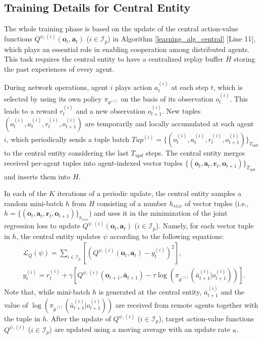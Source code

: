 \vspace{-10pt}
\subsection{Training Details for Central Entity}

The whole training phase is based on the update of the central action-value functions $Q^{\psi,(i)}(\mathbf{o}_t,\mathbf{a}_t)$ ($i\in\mathcal{I}_p$) in Algorithm \ref{learning_alg_central} [Line 11], which plays an essential role in enabling cooperation among distributed agents. 
This task requires the central entity to have a centralized replay buffer $H$ storing the past experiences of every agent.
	
During network operations, agent $i$ plays action $a^{(i)}_t$ at each step $t$, which is selected by using its own policy $\pi_{\theta^{(i)}}$ on the basis of its observation $o^{(i)}_t$. This leads to a reward $r^{(i)}_t$ and a new observation $o^{(i)}_{t+1}$. New tuples $(o^{(i)}_t, a^{(i)}_t, r^{(i)}_t, o^{(i)}_{t+1})$ are temporarily and locally accumulated at each agent $i$, which periodically sends a tuple batch $Tup^{(i)}=\{(o^{(i)}_t, a^{(i)}_t, r^{(i)}_t, o^{(i)}_{t+1})\}_{T_{upd}}$ to the central entity considering the last $T_{upd}$ steps. The central entity merges received per-agent tuples into agent-indexed vector tuples $\{(\mathbf{o}_t,\mathbf{a}_t,\mathbf{r}_t,\mathbf{o}_{t+1})\}_{T_{upd}}$ and inserts them into $H$.

In each of the $K$ iterations of a periodic update, the central entity samples a random mini-batch $h$ from $H$ consisting of a number $h_{size}$ of vector tuples (i.e., $h=\{(\mathbf{o}_t, \mathbf{a}_t, \mathbf{r}_t, \mathbf{o}_{t+1})\}_{h_{size}}$) and uses it in the minimization of the joint regression loss to update $Q^{\psi,(i)}(\mathbf{o}_t,\mathbf{a}_t)$ ($i\in\mathcal{I}_p$). Namely, for each vector tuple in $h$, the central entity updates $\psi$ according to the following equations:
\begin{align}
    & \mathcal{L}_Q(\psi) = \sum_{i \in \mathcal{I}_p}[(Q^{\psi,(i)}(\mathbf{o}_t,\mathbf{a}_t)-y^{(i)}_t)^2], \label{critic_loss_alg}\\
    & y^{(i)}_t = r^{(i)}_t + \gamma[Q^{\bar{\psi},(i)}(\mathbf{o}_{t+1}, \mathbf{\bar{a}}_{t+1}) - \tau\log(\pi_{\bar{\theta}^{(i)}}(\bar{a}_{t+1}^{(i)}|o_{t+1}^{(i)}))].\label{y_i_alg}
\end{align}
Note that, while mini-batch $h$ is generated at the central entity, $\bar{a}_{t+1}^{(i)}$ and the value of $\log(\pi_{\bar{\theta}^{(i)}}(\bar{a}_{t+1}^{(i)}|o_{t+1}^{(i)}))$ are received from remote agents together with the tuple in $h$.
After the update of $Q^{\psi,(i)}$ ($i\in\mathcal{I}_p$), target action-value functions $Q^{\bar{\psi},(i)}$ ($i\in\mathcal{I}_p$) are updated using a moving average with an update rate $\kappa$.


